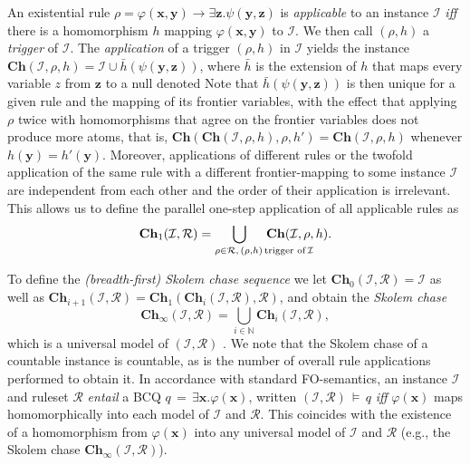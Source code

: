\documentclass[10pt,a4paper]{amsart}
\theoremstyle{definition}
\numberwithin{equation}{section}
\theoremstyle{plain}
\theoremstyle{definition}
\theoremstyle{myexample}
\theoremstyle{plain}
\theoremstyle{definition}
\renewcommand{\vec}[1]{\boldsymbol{#1}}
\newcommand{\instance}{\mathcal{I}}
\newcommand{\inst}{\instance}
\newcommand{\hism}{h}
\newcommand{\ruleset}{\calr}
\newcommand{\chase}{\mathbf{Ch}}
\newcommand{\fchain}[1]{\chase(#1)}
\newcommand{\ksat}[2]{\chase_{#1}(#2)}
\newcommand{\sat}[1]{\ksat{\infty}{#1}}
\newcommand{\calr}{\mathcal{R}}
\newcommand{\vx}{\vec{x}}
\newcommand{\vy}{\vec{y}}
\newcommand{\vz}{\vec{z}}
\newcommand{\query}{q}
\newcommand{\ifandonlyif}{\textit{iff} } %
\newcommand{\iffi}{\textit{iff} } %
\renewcommand{\phi}{\varphi}
\begin{document}
\medskip {}
An existential rule $\rho = \phi(\vx,\vy) \rightarrow \exists \vz. \psi(\vy,\vz)$ is \emph{applicable} to an instance $\instance$ \ifandonlyif there is a homomorphism $\hism$ mapping $\phi(\vec{x},\vec{y})$ to $\instance$. We then call $(\rho, \hism)$ a \emph{trigger} of $\instance$.
The \emph{application} of a trigger $(\rho, \hism)$ in $\instance$ yields the instance $\fchain{\inst,\rho,\hism} = \instance \cup \bar\hism(\psi(\vec{y},\vec{z}))$, where $\bar\hism$ is the extension of $\hism$ that maps every variable $z$ from $\vz$ to a null denoted \smash{$z_{\rho,\hism(\vy)}$.} 
Note that $\bar\hism(\psi(\vec{y},\vec{z}))$ is then unique for a given rule and the mapping of its frontier variables, with the effect that applying $\rho$ twice with homomorphisms that agree on the frontier variables does not produce more atoms, that is,
$\fchain{\fchain{\inst,\rho,\hism},\rho,\hism'} = \fchain{\inst,\rho,\hism}$ whenever $\hism(\vy) = \hism'(\vy)$. Moreover, applications of different rules or the twofold application of the same rule with a different frontier-mapping to some instance $\instance$ are independent from each other and the order of their application is irrelevant. This allows us to define the parallel one-step application of all applicable rules as 
$$\ksat{1}{\inst,\ruleset} = 
\hspace{-9ex}\bigcup_{\hspace{9ex}\rho\in \ruleset,\,(\rho, \hism) \text{\,trigger of\,} \instance}\hspace{-9ex} 
\fchain{\inst,\rho,\hism}.$$     

To define the \emph{(breadth-first) Skolem chase sequence} we let 
$\ksat{0}{\inst,\ruleset} = \inst$ as well as $\ksat{i+1}{\inst,\ruleset} = \ksat{1}{\ksat{i}{\inst,\ruleset}, \ruleset}$, and obtain the \emph{Skolem chase} $$\sat{\inst,\ruleset} = \bigcup_{i\in \mathbb{N}} \ksat{i}{\inst,\ruleset},$$which is a universal model of $(\inst,\ruleset)$ \cite{fkmp05,marnette09}. We note that the Skolem chase of a countable instance is countable, as  is the number of overall rule applications performed to obtain it. 
%
In accordance with standard FO-semantics, an instance $\inst$ and ruleset $\ruleset$ \emph{entail} a BCQ $\query {\,=\,} \exists \vx .\phi(\vx)$, written $(\inst,\! \ruleset) {\,\models\,} \query$  \iffi $\phi(\vx)$ maps homomorphically into each model of $\inst$ and $\ruleset$. This coincides with  the existence of a homomorphism from $\phi(\vx)$ into any universal model of $\inst$ and $\ruleset$ (e.g., the Skolem chase $\sat{\inst, \ruleset}$).
\end{document}
